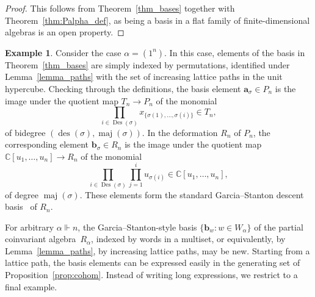 \documentclass[a4paper,11pt]{amsart}
\theoremstyle{plain}
\theoremstyle{definition}
\newtheorem{example}[theorem]{Example}
\newcommand{\C}{\mathbb{C}}
\DeclareMathOperator{\maj}{maj}
\DeclareMathOperator{\des}{des}
\DeclareMathOperator{\Des}{Des}
\begin{document}
\begin{proof} This follows from Theorem~\ref{thm_bases} together
with Theorem~\ref{thm:Palpha_def}, 
as being a basis in a flat family of finite-dimensional algebras is an open property. 
\end{proof}

\begin{example} Consider the case $\alpha=(1^n)$. In this case, elements of the basis in Theorem~\ref{thm_bases} are simply indexed by permutations, identified under Lemma~\ref{lemma_paths} with the set of increasing lattice paths in the unit hypercube. 
Checking through the definitions, the basis element $\mathbf{a}_\sigma\in P_n$ is the image under the quotient map $T_n\to P_n$ of the monomial
\[\prod_{i\in\Des(\sigma)} x_{\{\sigma(1),\ldots, \sigma(i)\}}\in T_n,  
\]
of bidegree $(\des(\sigma), \maj(\sigma))$.
In the deformation $R_n$ of $P_n$, the corresponding element $\mathbf{b}_\sigma\in R_n$ is the image under the quotient map $\C[u_1,\ldots, u_n]\to R_n$ of the monomial
\[
\prod_{i\in\Des(\sigma)} \prod_{j=1}^i u_{\sigma(i)}\in \C[u_1,\ldots, u_n],
\]
of degree $\maj(\sigma)$. These elements form the standard Garcia--Stanton descent basis~\cite{GS} of $R_n$. 
\end{example}

For arbitrary $\alpha\Vdash n$, the Garcia--Stanton-style basis $\{\mathbf{b}_w : w \in W_\alpha\}$ of the partial coinvariant algebra~$R_\alpha$, indexed by words in a multiset, or equivalently, by Lemma~\ref{lemma_paths}, by increasing lattice paths, may be new. Starting from a lattice path, the basis elements can be expressed easily in the generating set of Proposition~\ref{prop:cohom}. Instead of writing long expressions, we restrict to a final example. 
\end{document}

